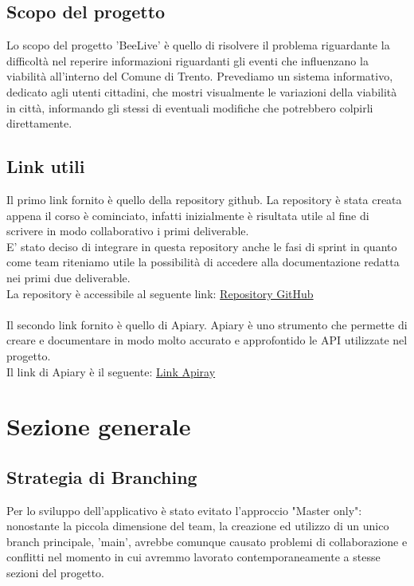 \documentclass{article}
\begin{document}
\subsection{Scopo del progetto}

Lo scopo del progetto 'BeeLive' è quello di risolvere il problema riguardante la difficoltà nel reperire informazioni riguardanti gli eventi che influenzano la viabilità all'interno del Comune di Trento. Prevediamo un sistema informativo, dedicato agli utenti cittadini, che mostri visualmente le variazioni della viabilità in città, informando gli stessi di eventuali modifiche che potrebbero colpirli direttamente.

\subsection{Link utili}
Il primo link fornito è quello della repository github. La repository è stata creata appena il corso è cominciato, infatti inizialmente è risultata utile al fine di scrivere in modo collaborativo i primi deliverable.\\
E' stato deciso di integrare in questa repository anche le fasi di sprint in quanto come team riteniamo utile la possibilità di accedere alla documentazione redatta nei primi due deliverable.\\
La repository è accessibile al seguente link: \href{https://github.com/ELI20ZIVI/BeeLive/}{Repository GitHub}\\ \\
Il secondo link fornito è quello di Apiary. Apiary è uno strumento che permette di creare e documentare in modo molto accurato e approfontido le API utilizzate nel progetto.\\
Il link di Apiary è il seguente: \href{https://beelive.docs.apiary.io/#}{Link Apiray}\\

\clearpage

\section{Sezione generale}

\subsection{Strategia di Branching}

Per lo sviluppo dell'applicativo è stato evitato l'approccio "Master only": nonostante la piccola dimensione del team, la creazione ed utilizzo di un unico branch principale, 'main', avrebbe comunque causato problemi di collaborazione e conflitti nel momento in cui avremmo lavorato contemporaneamente a stesse sezioni del progetto.\\
\end{document}

